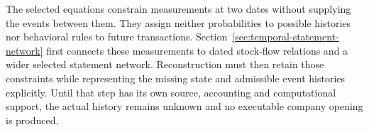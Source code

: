 The selected equations constrain measurements at two dates without supplying
the events between them. They assign neither probabilities to possible
histories nor behavioral rules to future transactions. Section~\ref{sec:temporal-statement-network} first connects these measurements
to dated stock-flow relations and a wider selected statement network.
Reconstruction must then retain those constraints while representing the
missing state and admissible event histories explicitly. Until that step
has its own source, accounting and computational support, the actual history
remains unknown and no executable company opening is produced.
